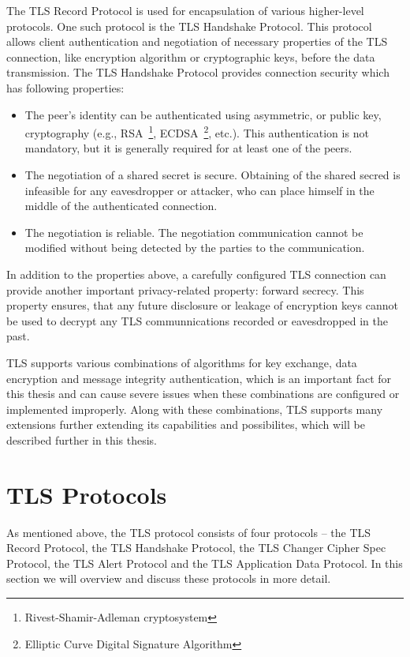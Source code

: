     The TLS Record Protocol is used for encapsulation of various higher-level
    protocols. One such protocol is the TLS Handshake Protocol. This protocol
    allows client authentication and negotiation of necessary properties
    of the TLS connection, like encryption algorithm or cryptographic keys,
    before the data transmission. The TLS Handshake Protocol provides
    connection security which has following properties:
    \begin{itemize}
        \item The peer's identity can be authenticated using asymmetric, or
        public key, cryptography (e.g.,
        RSA~\footnote{Rivest-Shamir-Adleman cryptosystem},
        ECDSA~\footnote{Elliptic Curve Digital Signature Algorithm}, etc.).
        This authentication is not mandatory, but it is generally required
        for at least one of the peers.
        \item The negotiation of a shared secret is secure. Obtaining of
        the shared secred is infeasible for any eavesdropper or attacker,
        who can place himself in the middle of the authenticated connection.
        \item The negotiation is reliable. The negotiation communication
        cannot be modified without being detected by the parties to the
        communication.~\cite{rfc5246}
    \end{itemize}

    In addition to the properties above, a carefully configured TLS connection
    can provide another important privacy-related property: forward secrecy.
    This property ensures, that any future disclosure or leakage of encryption
    keys cannot be used to decrypt any TLS communnications recorded or
    eavesdropped in the past.

    TLS supports various combinations of algorithms for key exchange, data
    encryption and message integrity authentication, which is an important fact
    for this thesis and can cause severe issues when these combinations
    are configured or implemented improperly. Along with these combinations,
    TLS supports many extensions further extending its capabilities and possibilites,
    which will be described further in this thesis.

\section{TLS Protocols}
    As mentioned above, the TLS protocol consists of four protocols --
    the TLS Record Protocol, the TLS Handshake Protocol, the TLS Changer Cipher
    Spec Protocol, the TLS Alert Protocol and the TLS Application Data Protocol.
    In this section we will overview and discuss these protocols in more detail.

